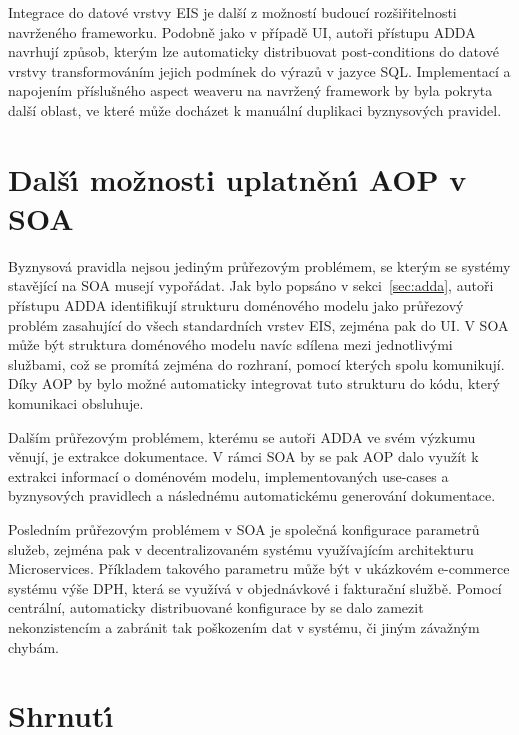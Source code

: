 Integrace do datové vrstvy \gls{EIS} je další z možností budoucí rozšiřitelnosti navrženého frameworku.
Podobně jako v případě \gls{UI}, autoři přístupu \gls{ADDA} navrhují způsob, kterým lze automaticky distribuovat
post-conditions do datové vrstvy transformováním jejich podmínek do výrazů v jazyce \gls{SQL}.
Implementací a napojením příslušného aspect weaveru na navržený framework by byla pokryta další oblast,
ve které může docházet k manuální duplikaci byznysových pravidel.

\section{Dalš\'{\i} možnosti uplatněn\'{\i} AOP v SOA}

Byznysová pravidla nejsou jediným průřezovým problémem, se kterým se systémy stavějící na \gls{SOA} musejí
vypořádat. Jak bylo popsáno v sekci~\ref{sec:adda}, autoři přístupu \gls{ADDA} identifikují strukturu
doménového modelu jako průřezový problém zasahující do všech standardních vrstev \gls{EIS},
zejména pak do \gls{UI}. V \gls{SOA} může být struktura doménového modelu navíc sdílena mezi jednotlivými
službami, což se promítá zejména do rozhraní, pomocí kterých spolu komunikují.
Díky \gls{AOP} by bylo možné automaticky integrovat tuto strukturu do kódu, který komunikaci obsluhuje.

Dalším průřezovým problémem, kterému se autoři \gls{ADDA} ve svém výzkumu věnují, je extrakce dokumentace.
V rámci \gls{SOA} by se pak \gls{AOP} dalo využít k extrakci informací o doménovém modelu, implementovaných use-cases
a byznysových pravidlech a následnému automatickému generování dokumentace.

Posledním průřezovým problémem v \gls{SOA} je společná konfigurace parametrů služeb, zejména pak v
decentralizovaném systému využívajícím architekturu Microservices. Příkladem takového parametru může
být v ukázkovém e-commerce systému výše DPH, která se využívá v objednávkové i
fakturační službě. Pomocí centrální, automaticky distribuované konfigurace by se dalo zamezit nekonzistencím
a zabránit tak poškozením dat v systému, či jiným závažným chybám.

\section{Shrnut\'{\i}}

